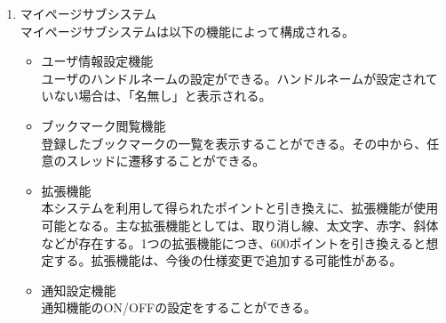 \documentclass[a4j]{jarticle}
\begin{document}
\begin{enumerate}
  \item マイページサブシステム\\
  マイページサブシステムは以下の機能によって構成される。
  \begin{itemize}
    \item ユーザ情報設定機能\\
    ユーザのハンドルネームの設定ができる。ハンドルネームが設定されていない場合は、「名無し」と表示される。
    \item ブックマーク閲覧機能\\
    登録したブックマークの一覧を表示することができる。その中から、任意のスレッドに遷移することができる。
    \item 拡張機能\\
    本システムを利用して得られたポイントと引き換えに、拡張機能が使用可能となる。主な拡張機能としては、取り消し線、太文字、赤字、斜体などが存在する。1つの拡張機能につき、600ポイントを引き換えると想定する。拡張機能は、今後の仕様変更で追加する可能性がある。
    \item 通知設定機能\\
    通知機能のON/OFFの設定をすることができる。
  \end{itemize}
\end{enumerate}
\end{document}
